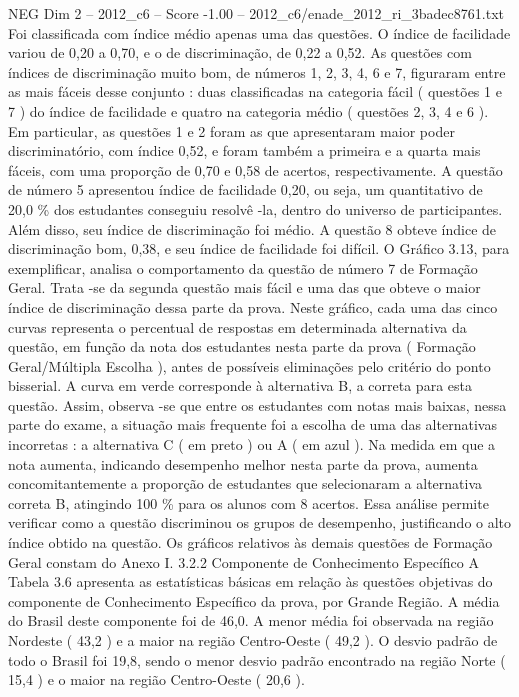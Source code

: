 \begin{textsample}{NEG Dim 2 – 2012\_c6 – Score -1.00 – 2012\_c6/enade\_2012\_ri\_3badec8761.txt}
Foi classificada com índice médio apenas uma das questões.
O índice de facilidade variou de 0,20 a 0,70, e o de discriminação, de 0,22 a 0,52.
As questões com índices de discriminação muito bom, de números 1, 2, 3, 4, 6 e 7, figuraram entre as mais fáceis desse conjunto : duas classificadas na categoria fácil ( questões 1 e 7 ) do índice de facilidade e quatro na categoria médio ( questões 2, 3, 4 e 6 ).
Em particular, as questões 1 e 2 foram as que apresentaram maior poder discriminatório, com índice 0,52, e foram também a primeira e a quarta mais fáceis, com uma proporção de 0,70 e 0,58 de acertos, respectivamente.
A questão de número 5 apresentou índice de facilidade 0,20, ou seja, um quantitativo de 20,0 \% dos estudantes conseguiu resolvê -la, dentro do universo de participantes.
Além disso, seu índice de discriminação foi médio.
A questão 8 obteve índice de discriminação bom, 0,38, e seu índice de facilidade foi difícil.
O Gráfico 3.13, para exemplificar, analisa o comportamento da questão de número 7 de Formação Geral.
Trata -se da segunda questão mais fácil e uma das que obteve o maior índice de discriminação dessa parte da prova.
Neste gráfico, cada uma das cinco curvas representa o percentual de respostas em determinada alternativa da questão, em função da nota dos estudantes nesta parte da prova ( Formação Geral/Múltipla Escolha ), antes de possíveis eliminações pelo critério do ponto bisserial.
A curva em verde corresponde à alternativa B, a correta para esta questão.
Assim, observa -se que entre os estudantes com notas mais baixas, nessa parte do exame, a situação mais frequente foi a escolha de uma das alternativas incorretas : a alternativa C ( em preto ) ou A ( em azul ).
Na medida em que a nota aumenta, indicando desempenho melhor nesta parte da prova, aumenta concomitantemente a proporção de estudantes que selecionaram a alternativa correta B, atingindo 100 \% para os alunos com 8 acertos.
Essa análise permite verificar como a questão discriminou os grupos de desempenho, justificando o alto índice obtido na questão.
Os gráficos relativos às demais questões de Formação Geral constam do Anexo I. 3.2.2 Componente de Conhecimento Específico A Tabela 3.6 apresenta as estatísticas básicas em relação às questões objetivas do componente de Conhecimento Específico da prova, por Grande Região.
A média do Brasil deste componente foi de 46,0.
A menor média foi observada na região Nordeste ( 43,2 ) e a maior na região Centro-Oeste ( 49,2 ).
O desvio padrão de todo o Brasil foi 19,8, sendo o menor desvio padrão encontrado na região Norte ( 15,4 ) e o maior na região Centro-Oeste ( 20,6 ).

\end{textsample}
